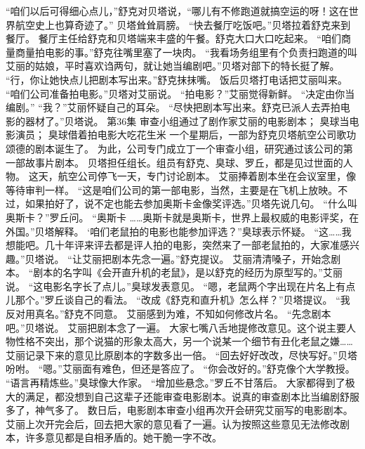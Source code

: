 \documentclass[a4paper,12pt,UTF8,twoside]{ctexbook}
\begin{document}
        “咱们以后可得细心点儿，”舒克对贝塔说，“哪儿有不修跑道就搞空运的呀！这在世界航空史上也算奇迹了。” 
        贝塔耸耸肩膀。 
        “快去餐厅吃饭吧。”贝塔拉着舒克来到餐厅。 
        餐厅主任给舒克和贝塔端来丰盛的午餐。舒克大口大口吃起来。 
        “咱们商量商量拍电影的事。”舒克往嘴里塞了一块肉。 
        “我看场务组里有个负责扫跑道的叫艾丽的姑娘，平时喜欢诌两句，就让她当编剧吧。”贝塔对部下的特长挺了解。 
        “行，你让她快点儿把剧本写出来。”舒克抹抹嘴。 
        饭后贝塔打电话把艾丽叫来。 
        “咱们公司准备拍电影。”贝塔对艾丽说。 
        “拍电影？”艾丽觉得新鲜。 
        “决定由你当编剧。” 
        “我？”艾丽怀疑自己的耳朵。 
        “尽快把剧本写出来。舒克已派人去弄拍电影的器材了。”贝塔说。   第36集 
        审查小组通过了剧作家艾丽的电影剧本； 
        臭球当电影演员； 
        臭球借着拍电影大吃花生米   
        一个星期后，一部为舒克贝塔航空公司歌功颂德的剧本诞生了。 
        为此，公司专门成立丁一个审查小组，研究通过该公司的第一部故事片剧本。 
        贝塔担任组长。组员有舒克、臭球、罗丘，都是见过世面的人物。 
        这天，航空公司停飞一天，专门讨论剧本。 
        艾丽捧着剧本坐在会议室里，像等待审判一样。 
        “这是咱们公司的第一部电影，当然，主要是在飞机上放映。不过，如果拍好了，说不定也能去参加奥斯卡金像奖评选。”贝塔先说几句。 
        “什么叫奥斯卡？”罗丘问。 
        “奥斯卡 ……奥斯卡就是奥斯卡，世界上最权威的电影评奖，在外国。”贝塔解释。 
        ‘咱们老鼠拍的电影也能参加评选？”臭球表示怀疑。 
        “这……我想能吧。几十年评来评去都是评人拍的电影，突然来了一部老鼠拍的，大家准感兴趣。”贝塔说。 
        “让艾丽把剧本先念一遍。”舒克提议。 
        艾丽清清嗓子，开始念剧本。 
        “剧本的名字叫《会开直升机的老鼠》，是以舒克的经历为原型写的。”艾丽说。 
        “这电影名字长了点儿。”臭球发表意见。 
        “嗯，老鼠两个字出现在片名上有点儿那个。”罗丘谈自己的看法。 
        “改成《舒克和直升机》怎么样？”贝塔提议。 
        “我反对用真名。”舒克不同意。 
        艾丽感到为难，不知如何修改片名。 
        “先念剧本吧。”贝塔说。 
        艾丽把剧本念了一遍。 
        大家七嘴八舌地提修改意见。这个说主要人物性格不突出，那个说猫的形象太高大，另一个说某一个细节有丑化老鼠之嫌…… 
        艾丽记录下来的意见比原剧本的字数多出一倍。 
        “回去好好改改，尽快写好。”贝塔吩咐。 
        “嗯。”艾丽面有难色，但还是答应了。 
        “你会改好的。”舒克像个大学教授。 
        “语言再精炼些。”臭球像大作家。 
        “增加些悬念。”罗丘不甘落后。 
        大家都得到了极大的满足，都没想到自己这辈子还能审查电影剧本。说真的审查剧本比当编剧舒服多了，神气多了。 
        数日后，电影剧本审查小组再次开会研究艾丽写的电影剧本。 
        艾丽上次开完会后，回去把大家的意见看了一遍。认为按照这些意见无法修改剧本，许多意见都是自相矛盾的。她干脆一字不改。 
\end{document}
